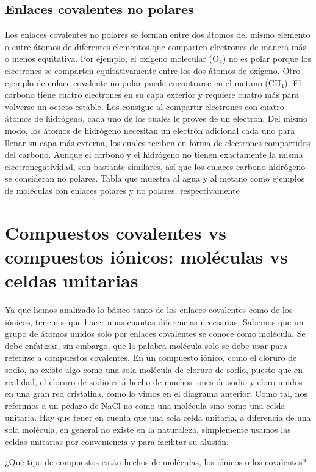 \documentclass[12pt]{guia}
\begin{document}
\begin{questions}
    \subsection{Enlaces covalentes no polares}
    Los enlaces covalentes no polares se forman entre dos átomos del mismo elemento o entre átomos de diferentes elementos que comparten electrones de manera más o menos equitativa. Por ejemplo, el oxígeno molecular (O$_2$) no es polar porque los electrones se comparten equitativamente entre los dos átomos de oxígeno.
    Otro ejemplo de enlace covalente no polar puede encontrarse en el metano (CH$_4$). El carbono tiene cuatro electrones en su capa exterior y requiere cuatro más para volverse un octeto estable. Los consigue al compartir electrones con cuatro átomos de hidrógeno, cada uno de los cuales le provee de un electrón. Del mismo modo, los átomos de hidrógeno necesitan un electrón adicional cada uno para llenar su capa más externa, los cuales reciben en forma de electrones compartidos del carbono. Aunque el carbono y el hidrógeno no tienen exactamente la misma electronegatividad, son bastante similares, así que los enlaces carbono-hidrógeno se consideran no polares.
    Tabla que muestra al agua y al metano como ejemplos de moléculas con enlaces polares y no polares, respectivamente


    \section{Compuestos covalentes vs compuestos iónicos: moléculas vs celdas unitarias}
    Ya que hemos analizado lo básico tanto de los enlaces covalentes como de los iónicos, tenemos que hacer unas cuantas diferencias necesarias. Sabemos que un grupo de átomos unidos solo por enlaces covalentes se conoce como molécula. Se debe enfatizar, sin embargo, que la palabra molécula solo se debe usar para referirse a compuestos covalentes. En un compuesto iónico, como el cloruro de sodio, no existe algo como una sola molécula de cloruro de sodio, puesto que en realidad, el cloruro de sodio está hecho de muchos iones de sodio y cloro unidos en una gran red cristalina, como lo vimos en el diagrama anterior. Como tal, nos referimos a un pedazo de NaCl no como una molécula sino como una celda unitaria. Hay que tener en cuenta que una sola celda unitaria, a diferencia de una sola molécula, en general no existe en la naturaleza, simplemente usamos las celdas unitarias por conveniencia y para facilitar su alusión.

    ¿Qué tipo de compuestos están hechos de moléculas, los iónicos o los covalentes?


\end{questions}
\end{document}
